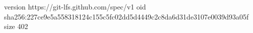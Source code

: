 version https://git-lfs.github.com/spec/v1
oid sha256:227ce9e5a558318124c155c5fc02dd5d4449c2c8da6d31de3107e0039d93a05f
size 402
